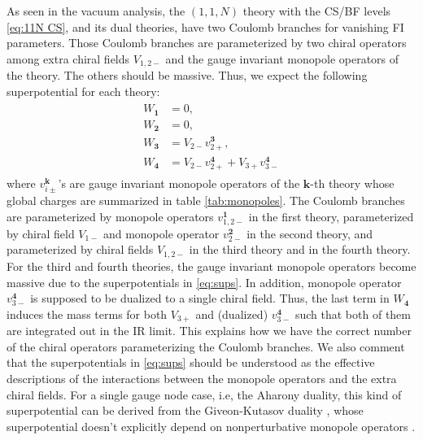 \documentclass[a4paper,11pt]{article}
\begin{document}
As seen in the vacuum analysis, the $(1,1,N)$ theory with the CS/BF levels \eqref{eq:11N CS}, and its dual theories, have two Coulomb branches for vanishing FI parameters. Those Coulomb branches are parameterized by two chiral operators among extra chiral fields $V_{1,2-}$ and the gauge invariant monopole operators of the theory. The others should be massive. Thus, we expect the following superpotential for each theory:
\begin{align}
\begin{aligned}
\label{eq:sups}
W_{\mathbf 1} &= 0, \\
W_{\mathbf 2} &= 0, \\
W_{\mathbf 3} &= V_{2-} v_{2+}^{\mathbf 3}, \\
W_{\mathbf 4} &= V_{2-} v_{2+}^{\mathbf 4}+V_{3+} v_{3-}^{\mathbf 4}
\end{aligned}
\end{align}
where $v_{i \pm}^{\mathbf k}$'s are gauge invariant monopole operators of the $\mathbf k$-th theory whose global charges are summarized in table \ref{tab:monopoles}. The Coulomb branches are parameterized by monopole operators $v_{1,2-}^{\mathbf 1}$ in the first theory, parameterized by chiral field $V_{1-}$ and monopole operator $v_{2-}^{\mathbf 2}$ in the second theory, and parameterized by chiral fields $V_{1,2-}$ in the third theory and in the fourth theory. For the third and fourth theories, the gauge invariant monopole operators become massive due to the superpotentials in \eqref{eq:sups}. In addition, monopole operator $v_{3-}^{\mathbf 4}$ is supposed to be dualized to a single chiral field. Thus, the last term in $W_{\mathbf 4}$ induces the mass terms for both $V_{3+}$ and (dualized) $v_{3-}^{\mathbf 4}$ such that both of them are integrated out in the IR limit. This explains how we have the correct number of the chiral operators parameterizing the Coulomb branches. We also comment that the superpotentials in \eqref{eq:sups} should be understood as the effective descriptions of the interactions between the monopole operators and the extra chiral fields. For a single gauge node case, i.e, the Aharony duality, this kind of superpotential can be derived from the Giveon-Kutasov duality \cite{Giveon:2008zn}, whose superpotential doesn't explicitly depend on nonperturbative monopole operators \cite{Intriligator:2013lca}.
\\
\end{document}
